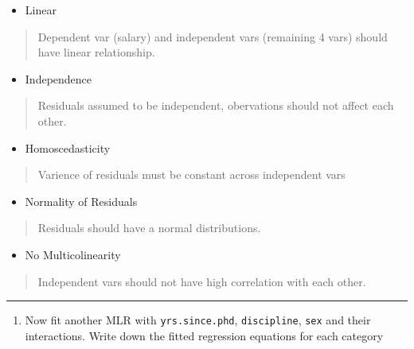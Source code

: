 \documentclass[
]{article}
\providecommand{\tightlist}{%
  \setlength{\itemsep}{0pt}\setlength{\parskip}{0pt}}
\begin{document}
\begin{itemize}
\tightlist
\item
  Linear
\end{itemize}

\begin{quote}
Dependent var (salary) and independent vars (remaining 4 vars) should
have linear relationship.
\end{quote}

\begin{itemize}
\tightlist
\item
  Independence
\end{itemize}

\begin{quote}
Residuals assumed to be independent, obervations should not affect each
other.
\end{quote}

\begin{itemize}
\tightlist
\item
  Homoscedasticity
\end{itemize}

\begin{quote}
Varience of residuals must be constant across independent vars
\end{quote}

\begin{itemize}
\tightlist
\item
  Normality of Residuals
\end{itemize}

\begin{quote}
Residuals should have a normal distributions.
\end{quote}

\begin{itemize}
\tightlist
\item
  No Multicolinearity
\end{itemize}

\begin{quote}
Independent vars should not have high correlation with each other.
\end{quote}

\begin{center}\rule{0.5\linewidth}{0.5pt}\end{center}

\begin{enumerate}
\def\labelenumi{\arabic{enumi}.}
\setcounter{enumi}{5}
\tightlist
\item
  Now fit another MLR with \texttt{yrs.since.phd}, \texttt{discipline},
  \texttt{sex} and their interactions. Write down the fitted regression
  equations for each category
\end{enumerate}
\end{document}
